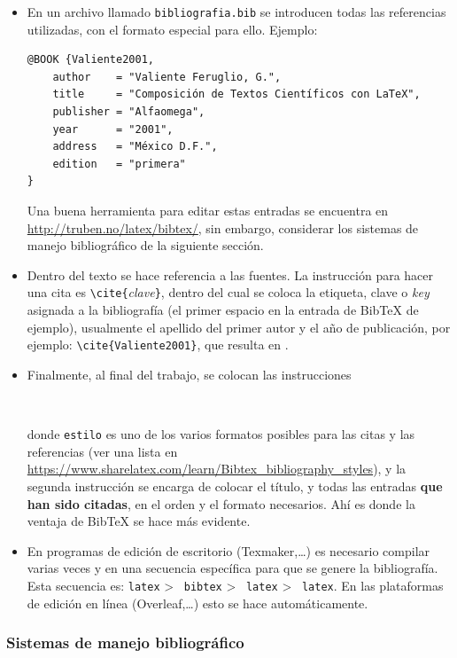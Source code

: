 \begin{itemize}
\item En un archivo llamado \texttt{bibliografia.bib} se introducen todas las referencias utilizadas, con el formato especial para ello. Ejemplo:
\begin{verbatim}
@BOOK {Valiente2001,
    author    = "Valiente Feruglio, G.",
    title     = "Composición de Textos Científicos con LaTeX",
    publisher = "Alfaomega",
    year      = "2001",
    address   = "México D.F.",
    edition   = "primera"
}
\end{verbatim}
Una buena herramienta para editar estas entradas se encuentra en \url{http://truben.no/latex/bibtex/}, sin embargo, considerar los sistemas de manejo bibliográfico de la siguiente sección.

\item Dentro del texto se hace referencia a las fuentes. La instrucción para hacer una cita es \verb+\cite{+\textit{clave}\verb+}+, dentro del cual se coloca la etiqueta, clave o \textit{key} asignada a la bibliografía (el primer espacio en la entrada de BibTeX de ejemplo), usualmente el apellido del primer autor y el año de publicación, por ejemplo: \verb+\cite{Valiente2001}+, que resulta en \cite{Valiente2001}.

\item Finalmente, al final del trabajo, se colocan las instrucciones 
\begin{verbatim}


\end{verbatim}
donde \texttt{estilo} es uno de los varios formatos posibles para las citas y las referencias (ver una lista en \url{https://www.sharelatex.com/learn/Bibtex_bibliography_styles}), y la segunda instrucción se encarga de colocar el título, y todas las entradas \textbf{que han sido citadas}, en el orden y el formato necesarios. Ahí es donde la ventaja de BibTeX se hace más evidente. 

\item En programas de edición de escritorio (Texmaker,\ldots) es necesario compilar varias veces y en una secuencia específica para que se genere la bibliografía. Esta secuencia es: \texttt{latex} \textgreater~ \texttt{bibtex} \textgreater~ \texttt{latex} \textgreater~ \texttt{latex}. En las plataformas de edición en línea (Overleaf,\ldots) esto se hace automáticamente.
\end{itemize}

\subsubsection{Sistemas de manejo bibliográfico}

